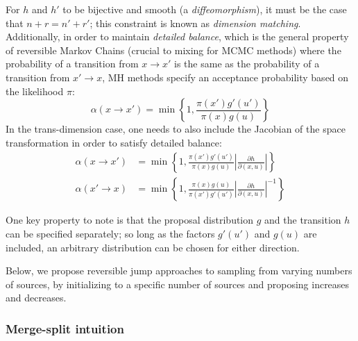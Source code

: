 \documentclass[11pt]{article}
\begin{document}
For $h$ and $h'$ to be bijective and smooth (a \emph{diffeomorphism}),
it must be the case that $n+r=n'+r'$; this constraint is known as
\emph{dimension matching}. Additionally, in order to maintain \emph{detailed
balance}, which is the general property of reversible Markov Chains
(crucial to mixing for MCMC methods) where the probability of a transition
from $x\to x'$ is the same as the probability of a transition from
$x'\to x$, MH methods specify an acceptance probability based on
the likelihood $\pi$: 
\[
\alpha\left(x\to x'\right)=\min\left\{ 1,\frac{\pi\left(x'\right)g'\left(u'\right)}{\pi\left(x\right)g\left(u\right)}\right\} 
\]
In the trans-dimension case, one needs to also include the Jacobian
of the space transformation in order to satisfy detailed balance:
\begin{align*}
\alpha\left(x\to x'\right) & =\min\left\{ 1,\frac{\pi\left(x'\right)g'\left(u'\right)}{\pi\left(x\right)g\left(u\right)}\left|\frac{\partial h}{\partial\left(x,u\right)}\right|\right\} \\
\alpha\left(x'\to x\right) & =\min\left\{ 1,\frac{\pi\left(x\right)g\left(u\right)}{\pi\left(x'\right)g'\left(u'\right)}\left|\frac{\partial h}{\partial\left(x,u\right)}\right|^{-1}\right\} 
\end{align*}




One key property to note is that the proposal distribution $g$ and
the transition $h$ can be specified separately; so long as the factors
$g'\left(u'\right)$ and $g\left(u\right)$ are included, an arbitrary
distribution can be chosen for either direction.

Below, we propose reversible jump approaches to sampling from varying
numbers of sources, by initializing to a specific number of sources
and proposing increases and decreases.


\subsubsection{Merge-split intuition}
\end{document}
